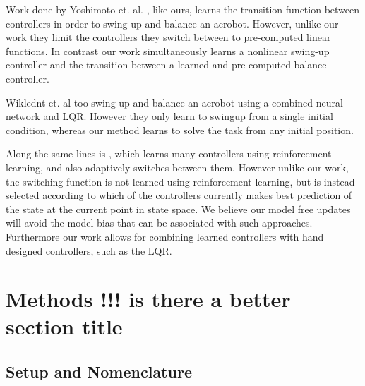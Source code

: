 \documentclass[letterpaper, 10 pt, conference]{ieeeconf}
\begin{document}
Work done by Yoshimoto et. al. \cite{yoshimoto_acrobot_2005}, like ours, learns the transition function between controllers in order to swing-up and balance an acrobot. However, unlike our work they limit the controllers they switch between to pre-computed linear functions. In contrast our work simultaneously learns a nonlinear swing-up controller and the transition between a learned and pre-computed balance controller.


Wiklednt et. al  \cite{wiklendt_small_2009} too swing up and balance an acrobot using a combined neural network and LQR. However they only learn to swingup from a single initial condition, whereas our method learns to solve the task from any initial position.



Along the same lines is \cite{doya_multiple_2002}, which learns many controllers using reinforcement learning, and also adaptively switches between them. However unlike our work, the switching function is not learned using reinforcement learning, but is instead selected according to which of the controllers currently makes best prediction of the state at the current point in state space. We believe our model free updates will avoid the model bias that can be associated with such approaches. Furthermore our work allows for combining learned controllers with hand designed controllers, such as the LQR.  

\section{Methods !!! is there a better section title}
\subsection{Setup and Nomenclature}
\end{document}
